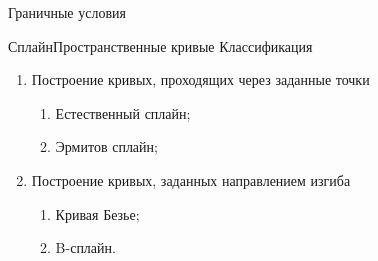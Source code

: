 \documentclass{beamer}
\begin{document}
\begin{frame}{Граничные условия}
{		}

	\end{frame}

	\begin{frame}{Сплайн}{Пространственные кривые}
		Классификация
		\begin{enumerate}
			\item Построение кривых, проходящих через заданные точки
			\begin{enumerate}
				\item Естественный сплайн;
				\item Эрмитов сплайн;
			\end{enumerate}
			\item Построение кривых, заданных направлением изгиба
			\begin{enumerate}
				\item Кривая Безье;
				\item B-сплайн.
			\end{enumerate}
		\end{enumerate}


	\end{frame}
\end{document}
